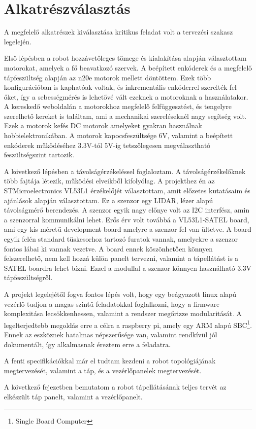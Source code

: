 \section{Alkatrészválasztás}

A megfelelő alkatrészek kiválasztása kritikus feladat volt a tervezési szakasz
legelején.

Első lépésben a robot hozzávetőleges tömege és kialakítása alapján választottam
motorokat, amelyek a fő beavatkozó szervek. A beépített enkóderek és a megfelelő
tápfeszültség alapján az n20e motorok mellett döntöttem. Ezek több
konfigurációban is kaphatóak voltak, és inkrementális enkóderrel szerelték fel
őket, így a sebességmérés is lehetővé vált ezeknek a motoroknak a használatakor.
A kereskedő weboldalán a motorokhoz megfelelő felfüggesztést, és tengelyre
szerelhető kereket is találtam, ami a mechanikai szereléseknél nagy segítség
volt. Ezek a motorok kefés DC motorok amelyeket gyakran használnak
hobbielektronikában. A motorok kapocsfeszültsége 6V, valamint a beépített
enkóderek működéséhez 3.3V-tól 5V-íg tetszőlegesen megválasztható feszültségszint
tartozik.

A következő lépésben a távolságérzékeléssel foglaloztam. A távolságérzékelőknek
több fajtája létezik, működési elveikből kifolyólag. A projekthez én az
STMicroelectronics VL53L1 érzékelőjét választottam, amit előzetes kutatásaim
és ajánlások alapján választottam. Ez a szenzor egy LIDAR, lézer alapú
távolságmérő berendezés. A szenzor egyik nagy előnye volt az I2C interfész, amin
a szenzorral kommunikálni lehet. Erős érv volt továbbá a VL53L1-SATEL board, ami
egy kis méretű development board amelyre a szenzor fel van ültetve. A board
egyik felén standard tüskesorhoz tartozó furatok vannak, amelyekre a szenzor 
fontos lábai ki vannak vezetve. A board ennek köszönhetően könnyen felszerelhető,
nem kell hozzá külön panelt tervezni, valamint a tápellátást is a SATEL boardra
lehet bízni. Ezzel a modullal a szenzor könnyen használható 3.3V
tápfeszültségről.

A projekt legelejétől fogva fontos lépés volt, hogy egy beágyazott linux alapú
vezérlő tudjon a magas szintű feladatokkal foglalkozni, hogy a firmware
komplexitása lecsökkenhessen, valamint a rendszer megőrizze modularitását. A
legelterjedtebb megoldás erre a célra a raspberry pi, amely egy ARM alapú
SBC\footnote{Single Board Computer}. Ennek az eszköznek hatalmas népszerűsége
van, valamint rendkívül jól dokumentált, így alkalmasnak éreztem erre a
feladatra.

A fenti specifikációkkal már el tudtam kezdeni a robot topológiájának
megtervezését, valamint a táp, és a vezérlőpanelek megtervezését.

A következő fejezetben bemutatom a robot tápellátásának teljes tervét az
elkészült táp panelt, valamint a vezérlőpanelt.

